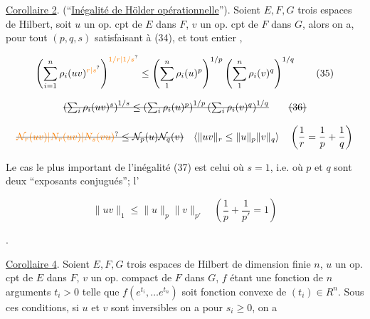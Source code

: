 \uline{Corollaire 2}. (``\uline{Inégalité de Hölder  opérationnelle}'').  Soient $E,F,G$ trois espaces de Hilbert, soit $u$ un op. cpt de $E$ dans $F$, $v$ un op. cpt de $F$ dans $G$, alors on a, pour tout  $(p,q,s)$  satisfaisant à (34), et tout entier ,

\[
\left(\sum_{i=1}^{n}\rho_i(uv)^{\unsure{r|s}}\right)^{\unsure{1/r|1/s}}\leq
\left(\sum_1^n\rho_i(u)^p\right)^{1/p}\left(\sum_1^n\rho_i(v)^q\right)^{1/q}\tag*{(35)}
\]


\[
\deleted{\left(\sum_i\rho_i(uv)^s\right)^{1/s}\leq
\left(\sum_i\rho_i(u)^p\right)^{1/p}\left(\sum_i\rho_i(v)^q\right)^{1/q}}
\tag*{\deleted{(36)}}
\]

\[
\deleted{\unsure{\mathcal N_r(uv)|N_r(uv)|N_s(vu)}\leq \mathcal N_p(u)\mathcal N_q(v)}
\quad \inserted{\|uv\|_r\leq\|u\|_p\|v\|_q}\quad
\left(\frac1r=\frac1p+\frac1q\right)
\]


Le cas le plus important de l'inégalité (37) est celui où $s=1$, i.e. où $p$ et $q$ sont deux ``exposants conjugués'';   l' 

\[
\boxed{\|uv\|_1\leq\|u\|_p\|v\|_{p'}\quad \left(\frac1p+\frac1{p'}=1\right)}\tag*{(38)}
\]

. 



\uline{Corollaire 4}. Soient $E,F,G$ trois espaces de Hilbert de  dimension finie $n$, $u$ un op. cpt de $E$ dans $F$, $v$ un op. compact de $F$ dans $G$, $f$ étant une fonction  de $n$ arguments $t_i>0$ telle que $f(e^{t_i},\dots e^{t_n})$ soit fonction convexe de $(t_i)\in R^n$. Sous ces conditions, si  $u$ et $v$ sont inversibles on a    pour $s_i\geq0$, on a 


